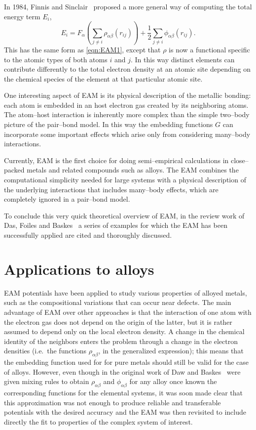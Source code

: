 In 1984, Finnis and Sinclair~\cite{Finnis1984EAM} proposed a more general way of computing the total energy term $E_i$,
\begin{equation}
    \label{eqn:EAM2}
    E_i= F_\alpha\left(\sum_{j\neq i} \rho_{\alpha\beta} (r_{ij}) \right) + \frac{1}{2} \sum_{j\neq i} \phi_{\alpha\beta}(r_{ij}).
\end{equation}
This has the same form as \cref{eqn:EAM1}, except that $\rho$ is now a functional specific to the atomic types of both atoms $i$ and $j$. In this way distinct  elements can contribute differently to the total electron density at an atomic site depending on the chemical species of the element at that particular atomic site.

One interesting aspect of EAM is its physical description of the metallic bonding: each atom is embedded in an host electron gas created by its neighboring atoms. The atom--host interaction is inherently more complex than the simple two--body picture of the pair--bond model. In this way the embedding functions $G$ can incorporate some important effects which arise only from considering many--body interactions.

Currently, EAM is the first choice for doing semi--empirical calculations in close--packed metals and related compounds such as alloys. The EAM combines the computational simplicity needed for large systems with a physical description of the underlying interactions that includes many--body effects, which are completely ignored in a pair--bond model.

To conclude this very quick theoretical overview of EAM, in the review work of Das, Foiles and Baskes~\cite{Daw1993REVIEW} a series of examples for which the EAM has been successfully applied are cited and thoroughly discussed.






\section{Applications to alloys}
EAM potentials have been applied to study various properties of alloyed metals, such as the compositional variations that can occur near defects. The main advantage of EAM over other approaches is that the interaction of one atom with the electron gas does not depend on the origin of the latter, but it is rather assumed to depend only on the local electron density. A change in the chemical identity of the neighbors enters the problem through a change in the electron densities (i.e.\ the functions $\rho_{\alpha\beta}$, in the generalized expression); this means that the embedding function used for for pure metals should still be valid for the case of alloys. However, even though in the original work of Daw and Baskes~\cite{Daw1984EAM} were given mixing rules to obtain $\rho_{\alpha\beta}$ and $\phi_{\alpha\beta}$ for any alloy once known the corresponding functions for the elemental systems, it was soon made clear that this approximation was not enough to produce reliable and transferable potentials with the desired accuracy and the EAM was then revisited to include directly the fit to properties of the complex system of interest.


